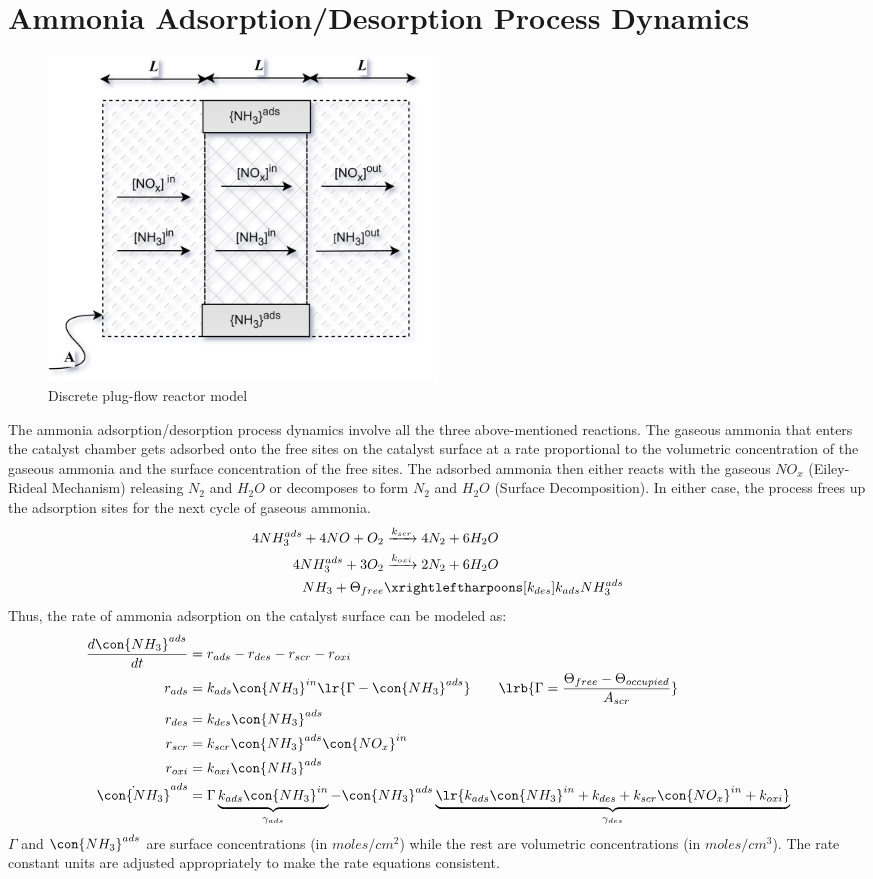 \newpage
\section{Ammonia Adsorption/Desorption Process Dynamics}
\begin{figure}[H]
    \centering
    \includegraphics[width=0.5\textwidth]{./figs/scr_sys/plug_flow_discrete.png}
    \caption{Discrete plug-flow reactor model}
    \label{fig:plug_flow_discrete}
\end{figure}
The ammonia adsorption/desorption process dynamics involve all the three above-mentioned reactions. The gaseous ammonia
that enters the catalyst chamber gets adsorbed onto the free sites on the catalyst surface at a rate proportional to the
volumetric concentration of the gaseous ammonia and the surface concentration of the free sites. The adsorbed ammonia
then either reacts with the gaseous $NO_x$ (Eiley-Rideal Mechanism) releasing $N_2$ and $H_2O$ or decomposes to form
$N_2$ and $H_2O$ (Surface Decomposition). In either case, the process frees up the adsorption sites for the next cycle
of gaseous ammonia.
\begin{align*}
    4 NH_3 ^{ads} + 4 NO + O_2 &\xrightarrow[]{k_{scr}} 4 N_2 + 6 H_2O \\
    4 NH_3^{ads} + 3 O_2 &\xrightarrow[]{k_{oxi}} 2 N_2 + 6 H_2O \\
    NH_3 + \Theta_{free} &\xrightleftharpoons[k_{des}]{k_{ads}} NH_3^{ads}
\end{align*}
Thus, the rate of ammonia adsorption on the catalyst surface can be modeled as:
\begin{align*}
    \frac{d \con{NH_3}^{ads}}{dt} &= r_{ads} - r_{des} - r_{scr} - r_{oxi}\\
    r_{ads} &= k_{ads} \con{NH_3}^{in} \lr{\Gamma - \con{NH_3}^{ads}} \qquad \lrb{\Gamma = \frac{\Theta_{free} - \Theta_{occupied}}{A_{scr}}}\\
    r_{des} &= k_{des} \con{NH_3}^{ads}\\
    r_{scr} &= k_{scr} \con{NH_3}^{ads} \con{NO_x}^{in}\\
    r_{oxi} &= k_{oxi} \con{NH_3}^{ads}\\
    \dot{\con{NH_3}}^{ads} &= \Gamma \underbrace{k_{ads} \con{NH_3}^{in}}_{\gamma_{ads}} - \con{NH_3}^{ads} \underbrace{\lr{k_{ads} \con{NH_3}^{in} + k_{des} + k_{scr} \con{NO_x}^{in} + k_{oxi}}}_{\gamma_{des}}
\end{align*}
 $\Gamma$ and $\con{NH_3}^{ads}$ are surface concentrations (in $moles/cm^2$) while the rest are volumetric
concentrations (in $moles/cm^3$). The rate constant units are adjusted appropriately to make the rate equations
consistent.

